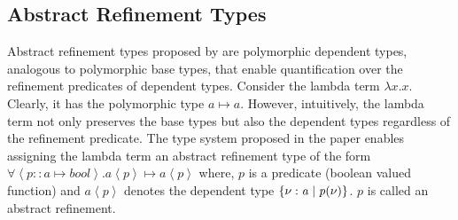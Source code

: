 \newcommand{\pr}[1]{\left< #1 \right>}
\newcommand{\lp}{\langle}
\newcommand{\rp}{\rangle}

\subsection{Abstract Refinement Types}

Abstract refinement types proposed by \cite{rjhala:ESOP13} are polymorphic dependent types, analogous to polymorphic base types, that enable quantification over the refinement predicates of dependent types. 
Consider the lambda term $\lambda x. x$. Clearly, it has the polymorphic 
type $a \mapsto a$. However, intuitively, the lambda term not only preserves the base types but also the dependent types regardless of the refinement predicate.
The type system proposed in the paper enables assigning the lambda term an 
abstract refinement type of the form $\forall \pr{p::a \mapsto bool}. a\pr{p} \mapsto a\pr{p}$
where, $p$ is a predicate (boolean valued function) and $a\pr{p}$ denotes the dependent type $\mathit{\{ \nu:a \; | \; p(\nu)\}}$. $p$ is called an abstract refinement.

